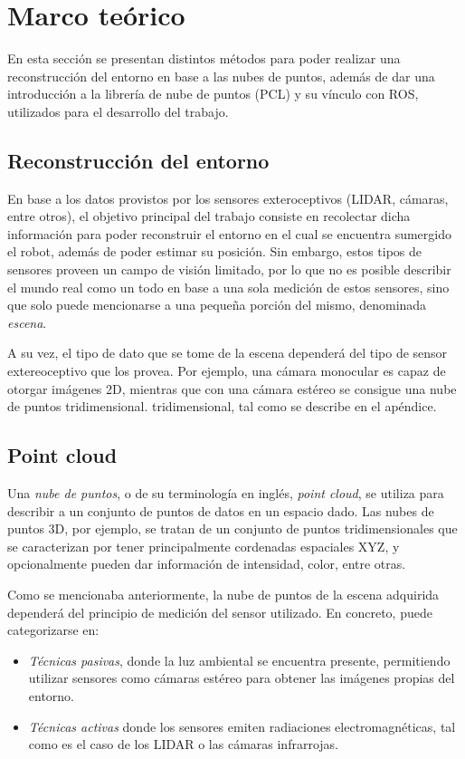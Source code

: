 \section{Marco teórico}
\label{sec:marcoteorico}
En esta sección se presentan distintos métodos para poder realizar una reconstrucción del entorno en base a las nubes de puntos, además de dar una introducción a la librería de nube de puntos (PCL) y su vínculo con ROS, utilizados para el desarrollo del trabajo.

\subsection{Reconstrucción del entorno}
En base a los datos provistos por los sensores exteroceptivos (LIDAR, cámaras, entre otros), el objetivo principal del trabajo consiste en recolectar dicha información para poder reconstruir el entorno en el cual se encuentra sumergido el robot, además de poder estimar su posición. Sin embargo, estos tipos de sensores proveen un campo de visión limitado, por lo que no es posible describir el mundo real como un todo en base a una sola medición de estos sensores, sino que solo puede mencionarse a una pequeña porción del mismo, denominada \textit{escena}.

A su vez, el tipo de dato que se tome de la escena dependerá del tipo de sensor extereoceptivo que los provea. Por ejemplo, una cámara monocular es capaz de otorgar imágenes 2D, mientras que con una cámara estéreo se consigue una nube de puntos 
\ifimagenes
\ifimagenespaper
tridimensional.
\else
tridimensional, tal como se describe en el apéndice.
\fi

\subsection{Point cloud}
Una \textit{nube de puntos}, o de su terminología en inglés, \textit{point cloud}, se utiliza para describir a un conjunto de puntos de datos en un espacio dado. Las nubes de puntos 3D, por ejemplo, se tratan de un conjunto de puntos tridimensionales que se caracterizan por tener principalmente cordenadas espaciales XYZ, y opcionalmente pueden dar información de intensidad, color, entre otras.

Como se mencionaba anteriormente, la nube de puntos de la escena adquirida dependerá del principio de medición del sensor utilizado. En concreto, puede categorizarse en: \cite{weinmann2016}
\begin{itemize}
    \item \textit{Técnicas pasivas}, donde la luz ambiental se encuentra presente, permitiendo utilizar sensores como cámaras estéreo para obtener las imágenes propias del entorno.
    \item \textit{Técnicas activas} donde los sensores emiten radiaciones electromagnéticas, tal como es el caso de los LIDAR o las cámaras infrarrojas.
\end{itemize}

